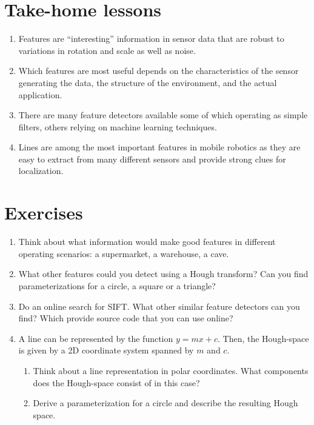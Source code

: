 \section*{Take-home lessons}
\begin{enumerate}
\item Features are ``interesting'' information in sensor data that are robust to variations in rotation and scale as well as noise.
\item Which features are most useful depends on the characteristics of the sensor generating the data, the structure of the environment, and the actual application.
\item There are many feature detectors available some of which operating as simple filters, others relying on machine learning techniques.
\item Lines are among the most important features in mobile robotics as they are easy to extract from many different sensors and provide strong clues for localization.
\end{enumerate}

\section*{Exercises}\small
\begin{enumerate}
\item Think about what information would make good features in different operating scenarios: a supermarket, a warehouse, a cave.
\item What other features could you detect using a Hough transform? Can you find parameterizations for a circle, a square or a triangle?
\item Do an online search for SIFT. What other similar feature detectors can you find? Which provide source code that you can use online?
\item A line can be represented by the function $y=mx+c$. Then, the Hough-space is given by a 2D coordinate system spanned by $m$ and $c$.\begin{enumerate}
\item Think about a line representation in polar coordinates. What components does the Hough-space consist of in this case?
\item Derive a parameterization for a circle and describe the resulting Hough space.
\end{enumerate}
\end{enumerate}
\normalsize
